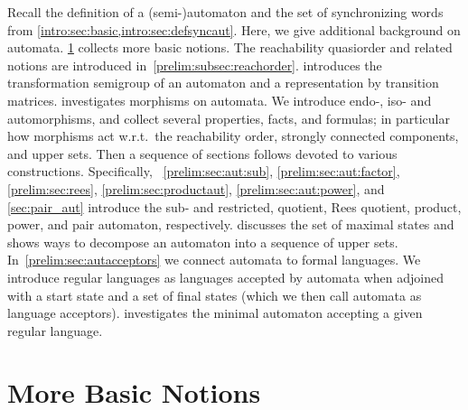 


Recall the definition of a (semi-)automaton and the set of synchronizing words
from \cref{intro:sec:basic,intro:sec:defsyncaut}.
Here, we give additional background on automata. %
\cref{prelim:subsec:morenotions} 
collects more basic notions. The reachability quasiorder and related
notions are introduced in~\cref{prelim:subsec:reachorder}.
 introduces
the transformation semigroup of an automaton
and a representation by transition matrices.
 investigates morphisms
on automata. We introduce endo-, iso- and automorphisms, 
and collect several properties, facts, and formulas; in particular
how morphisms act w.r.t.~the reachability order, strongly connected
components, and upper sets.
Then a sequence of sections follows
devoted to various constructions. 
Specifically, \SEC~\ref{prelim:sec:aut:sub}, \ref{prelim:sec:aut:factor}, \ref{prelim:sec:rees}, \ref{prelim:sec:productaut},
\ref{prelim:sec:aut:power}, and \ref{sec:pair_aut}
introduce the sub- and restricted, quotient, Rees quotient, product, power, and pair automaton, respectively.
 discusses
the set of maximal states and shows ways to decompose an automaton
into a sequence of upper sets. In~\cref{prelim:sec:autacceptors} 
we connect automata to formal languages.
We introduce regular languages
as languages accepted by automata when adjoined with a start state
and a set of final states (which we then call automata
as language acceptors).
 investigates the minimal automaton
accepting a given regular language.

\section{More Basic Notions}
\label{prelim:subsec:morenotions}

